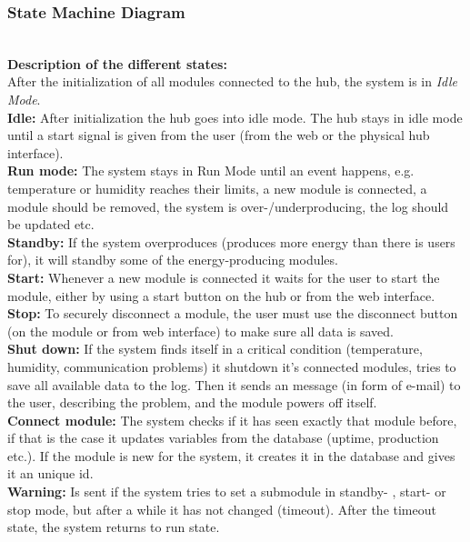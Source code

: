 \subsubsection{State Machine Diagram}\textbf{ }\\
	\textbf{Description of the different states: }
	\\ After the initialization of all modules connected to the hub, the system is in  \textit{Idle Mode}.
	\\\textbf{Idle: } After initialization the hub goes into idle mode. The hub stays in idle mode until a start signal is given from the user (from the web or the physical hub interface). 
	\\\textbf{Run mode: }The system stays in Run Mode until an event happens, e.g. temperature or humidity reaches their limits, a new module is connected, a module should be removed, the system is over-/underproducing, the log should be updated etc.
	\\\textbf{Standby: }If the system overproduces (produces more energy than there is users for), it will standby some of the energy-producing modules.
	\\\textbf{Start: }Whenever a new module is connected it waits for the user to start the module, either by using a start button on the hub or from the web interface.
	\\\textbf{Stop: }To securely disconnect a module, the user must use the disconnect button (on the module or from web interface) to make sure all data is saved.
	\\\textbf{Shut down: }If the system finds itself in a critical condition (temperature, humidity, communication problems) it shutdown it's connected modules, tries to save all available data to the log. Then it sends an message (in form of e-mail) to the user, describing the problem, and the module powers off itself. 
	\\\textbf{Connect module: } The system checks if it has seen exactly that module before, if that is the case it updates variables from the database (uptime, production etc.). If the module is new for the system, it creates it in the database and gives it an unique id.
	\\\textbf{Warning: }Is sent if the system tries to set a submodule in standby- , start- or stop mode, but after a while it has not changed (timeout). After the timeout state, the system returns to run state.

